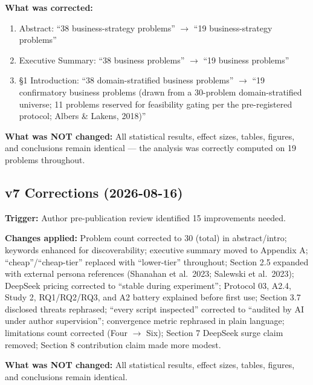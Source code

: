\documentclass[12pt,a4paper]{article}
\begin{document}
\textbf{What was corrected:}
\begin{enumerate}
  \item Abstract: ``38 business-strategy problems'' $\to$ ``19 business-strategy problems''
  \item Executive Summary: ``38 business problems'' $\to$ ``19 business problems''
  \item \S 1 Introduction: ``38 domain-stratified business problems'' $\to$ ``19 confirmatory business problems (drawn from a 30-problem domain-stratified universe; 11 problems reserved for feasibility gating per the pre-registered protocol; Albers \& Lakens, 2018)''
\end{enumerate}

\textbf{What was NOT changed:} All statistical results, effect sizes, tables, figures, and
conclusions remain identical --- the analysis was correctly computed on 19 problems throughout.

\subsection*{v7 Corrections (2026-08-16)}

\textbf{Trigger:} Author pre-publication review identified 15 improvements needed.

\textbf{Changes applied:} Problem count corrected to 30 (total) in abstract/intro;
keywords enhanced for discoverability; executive summary moved to Appendix A;
``cheap''/``cheap-tier'' replaced with ``lower-tier'' throughout; Section 2.5
expanded with external persona references (Shanahan et al.\ 2023; Salewski et
al.\ 2023); DeepSeek pricing corrected to ``stable during experiment'';
Protocol 03, A2.4, Study 2, RQ1/RQ2/RQ3, and A2 battery explained before
first use; Section 3.7 disclosed threats rephrased; ``every script inspected''
corrected to ``audited by AI under author supervision''; convergence metric
rephrased in plain language; limitations count corrected (Four $\to$ Six);
Section 7 DeepSeek surge claim removed; Section 8 contribution claim made
more modest.

\textbf{What was NOT changed:} All statistical results, effect sizes, tables, figures, and
conclusions remain identical.
\end{document}
